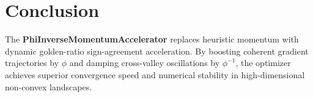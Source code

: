 \section{Conclusion}
The \textbf{PhiInverseMomentumAccelerator} replaces heuristic momentum with dynamic golden-ratio sign-agreement acceleration. By boosting coherent gradient trajectories by $\phi$ and damping cross-valley oscillations by $\phi^{-1}$, the optimizer achieves superior convergence speed and numerical stability in high-dimensional non-convex landscapes.